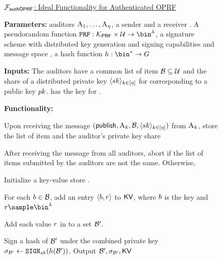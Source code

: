 \begin{figure}
\begin{mdframed}
\footnotesize 

\underline{$\mathcal{F}_{\mathsf{authOPRF}}$: Ideal Functionality for Authenticated OPRF}
		
		
		\smallskip\noindent\textbf{Parameters:} \numAuditors auditors $\auditor[1], \dots, \auditor[\numAuditors]$, a sender \client and a receiver \server. A pseudorandom function $\prf: \prfKeySpace \times \universe   \rightarrow \prfRange$, a signature scheme \ourSigSchemeDefn with distributed key generation and signing capabilities and message space \group, a hash function $\hashFn: \bin^{\ast} \rightarrow \group$   

		\smallskip\noindent\textbf{Inputs:} The auditors have a common list of item $\blocklist \subseteq \universe$ and the share of a distributed private key $\langle \privKey \rangle_{\auditorIdx \in \nats[\numAuditors]}$ for \ourSigScheme corresponding to a public key $\pubKey$. \client has the key \prfKey for \prf. 



		\smallskip\noindent\textbf{Functionality:} 
\itemListStart

\item	Upon receiving the message $(\publishList, \auditor[\auditorIdx], \blocklist, \langle \privKey \rangle_{\auditorIdx \in \nats[\numAuditors]})$ from $\auditor[\auditorIdx]$, store the list of item \blocklist and the auditor's private key share

\item After receiving the \publishList message from all auditors, abort if the list of items \blocklist submitted by the auditors are not the same. Otherwise, 

\enumListStart
\item Initialize a key-value store \kvs. 
\item For each $\genericBlocklistElmt \in \blocklist$, add an entry $\langle \genericBlocklistElmt, \genericRand \rangle$ to $\mathsf{KV}$, where $\genericBlocklistElmt$ is the key and $\genericRand \getsr \bin^{\secParam}$
\item Add each value $\genericRand$ in \kvs to a set $\blocklist'$.   
\item Sign a hash of $\blocklist'$ under the combined private key $\genericSig[\blocklist'] \assign \sign[\privKey](\hashFn(\blocklist'))$. Output $\blocklist', \genericSig[\blocklist'], \kvs$




\end{mdframed}
\end{figure}
